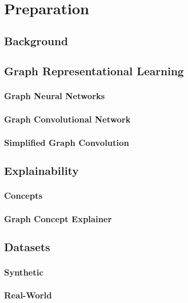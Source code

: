 \chapter{Preparation}

\section{Background}

\section{Graph Representational Learning}

\subsection{Graph Neural Networks}

\subsection{Graph Convolutional Network}

\subsection{Simplified Graph Convolution}

\section{Explainability}

\subsection{Concepts}

\subsection{Graph Concept Explainer}

\section{Datasets}

\subsection{Synthetic}

\subsection{Real-World}

